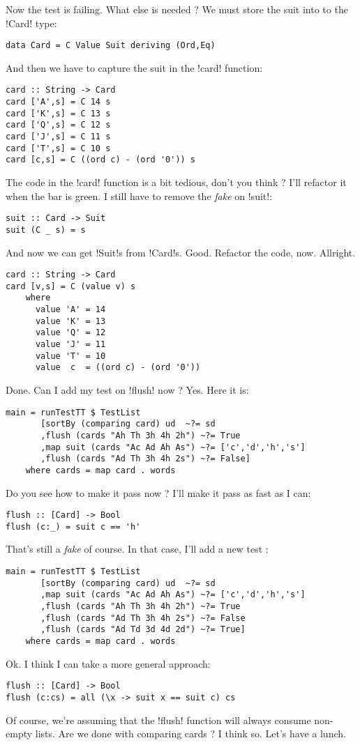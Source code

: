 \failure Now the test is failing.
\lhN What else is needed ?
\lhA \failure We must store the suit into to the \il!Card! type:
\begin{lstlisting}[frame=single]
data Card = C Value Suit deriving (Ord,Eq)
\end{lstlisting}
And then we have to capture the suit in the \il!card! function:
\begin{lstlisting}[frame=single]
card :: String -> Card
card ['A',s] = C 14 s
card ['K',s] = C 13 s
card ['Q',s] = C 12 s
card ['J',s] = C 11 s
card ['T',s] = C 10 s
card [c,s] = C ((ord c) - (ord '0')) s
\end{lstlisting}
\lhN \failure The code in the \il!card! function is a bit tedious, don't you think ?
\lhA \failure I'll refactor it when the bar is green. I still have to remove the \emph{fake} on \il!suit!:
\begin{lstlisting}[frame=single]
suit :: Card -> Suit
suit (C _ s) = s
\end{lstlisting}
\success And now we can get \il!Suit!s from \il!Card!s.
\lhN Good. Refactor the code, now.
\lhA \success Allright.
\begin{lstlisting}[frame=single]
card :: String -> Card
card [v,s] = C (value v) s
    where 
      value 'A' = 14
      value 'K' = 13
      value 'Q' = 12
      value 'J' = 11
      value 'T' = 10
      value  c  = ((ord c) - (ord '0'))
\end{lstlisting}
\success Done.
\lhN Can I add my test on \il!flush! now ?
\lhA Yes.
\lhN Here it is:
\begin{lstlisting}[frame=single]
main = runTestTT $ TestList 
       [sortBy (comparing card) ud  ~?= sd
       ,flush (cards "Ah Th 3h 4h 2h") ~?= True
       ,map suit (cards "Ac Ad Ah As") ~?= ['c','d','h','s']
       ,flush (cards "Ad Th 3h 4h 2s") ~?= False]
    where cards = map card . words
\end{lstlisting} %
Do you see how to make it pass now ?
\lhA \failure I'll make it pass as fast as I can:
\begin{lstlisting}[frame=single]
flush :: [Card] -> Bool
flush (c:_) = suit c == 'h'
\end{lstlisting}
\success That's still a \emph{fake} of course.
\lhN In that case, I'll add a new test :
\begin{lstlisting}[frame=single]
main = runTestTT $ TestList 
       [sortBy (comparing card) ud  ~?= sd
       ,map suit (cards "Ac Ad Ah As") ~?= ['c','d','h','s']
       ,flush (cards "Ah Th 3h 4h 2h") ~?= True
       ,flush (cards "Ad Th 3h 4h 2s") ~?= False
       ,flush (cards "Ad Td 3d 4d 2d") ~?= True]
    where cards = map card . words
\end{lstlisting} %
\hspace*{\fill}
\lhA \failure Ok. I think I can take a more general approach:
\begin{lstlisting}[frame=single]
flush :: [Card] -> Bool
flush (c:cs) = all (\x -> suit x == suit c) cs
\end{lstlisting}
\success Of course, we're assuming that the \il!flush! function will always consume non-empty lists. 
\lhN Are we done with comparing cards ?
\lhA I think so. Let's have a lunch.
\lhend
